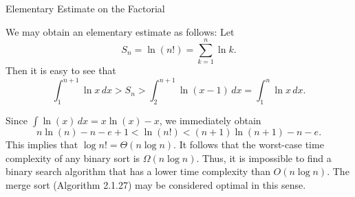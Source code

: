 \documentclass[smaller,hyperref={CJKbookmarks=true}]{beamer}
\begin{document}
\begin{frame}{Elementary Estimate on the Factorial}
\begin{spacing}{0.4}
We may obtain an elementary estimate as follows: Let
\[S_n=\ln(n!)=\sum_{k=1}^{n}\ln k.\]
Then it is easy to see that
\setcounter{equation}{0}
\begin{equation}\label{3.4.1}
\int_{1}^{n+1}\ln x\,dx>S_n>\int_{2}^{n+1}\ln(x-1)\,dx=\int_{1}^{n}\ln x\,dx.
\end{equation}
\begin{center}
\end{center}
\end{spacing}
\newpage
\begin{spacing}{1.1}
\vspace*{10pt}
Since $\int\ln(x)\,dx=x\ln(x)-x$, we immediately obtain
\[n\ln(n)-n-e+1<\ln(n!)<(n+1)\ln(n+1)-n-e.\]
This implies that $\log n!=\Theta(n\log n)$. It follows that the worst-case time complexity of any binary sort is $\Omega(n\log n)$. Thus, it is impossible to find a binary search algorithm that has a lower time complexity than $O(n\log n)$. The merge sort (Algorithm 2.1.27) may be considered optimal in this sense.
\end{spacing}
\end{frame}
\end{document}
